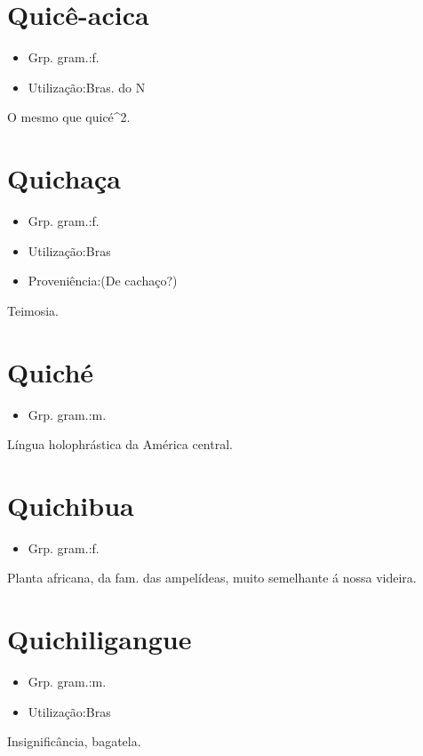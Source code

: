 \section{Quicê-acica}
\begin{itemize}
\item {Grp. gram.:f.}
\end{itemize}
\begin{itemize}
\item {Utilização:Bras. do N}
\end{itemize}
O mesmo que \textunderscore quicé\textunderscore ^2.
\section{Quichaça}
\begin{itemize}
\item {Grp. gram.:f.}
\end{itemize}
\begin{itemize}
\item {Utilização:Bras}
\end{itemize}
\begin{itemize}
\item {Proveniência:(De \textunderscore cachaço\textunderscore ?)}
\end{itemize}
Teimosia.
\section{Quiché}
\begin{itemize}
\item {Grp. gram.:m.}
\end{itemize}
Língua holophrástica da América central.
\section{Quichibua}
\begin{itemize}
\item {Grp. gram.:f.}
\end{itemize}
Planta africana, da fam. das ampelídeas, muito semelhante á nossa videira.
\section{Quichiligangue}
\begin{itemize}
\item {Grp. gram.:m.}
\end{itemize}
\begin{itemize}
\item {Utilização:Bras}
\end{itemize}
Insignificância, bagatela.

